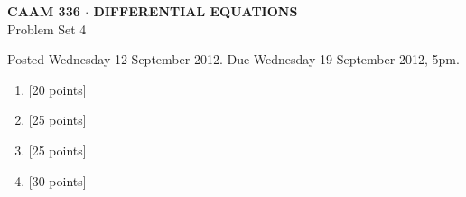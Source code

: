 \documentclass[10pt]{article}
\begin{document}
\begin{center}
\large \textsf{\textbf{CAAM 336 $\cdot$ DIFFERENTIAL EQUATIONS}\\[0.5em]
 Problem Set 4 }
\end{center}

Posted Wednesday 12 September 2012.  Due Wednesday 19 September 2012, 5pm.

\begin{enumerate}
\item {[20 points]}\\  

\vspace*{2em}
\item {[25 points]}\\  

\vspace*{2em}
\item {[25 points]}\\  

\vspace*{2em}
\item {[30 points]}\\  
\end{enumerate}
\end{document}
